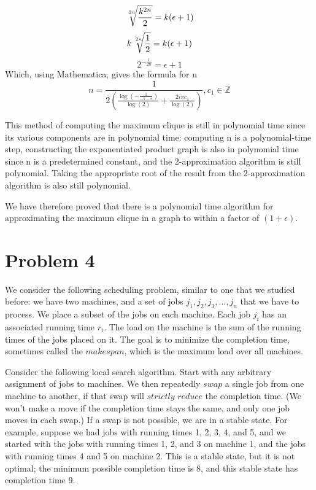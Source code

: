 \documentclass[11pt]{article}
\begin{document}
\begin{equation*}
	\sqrt[\leftroot{-3}\uproot{3}2n]{\frac{k^{2n}}{2}} = k(\epsilon + 1)
\end{equation*}
\begin{equation*}
	k\sqrt[\leftroot{-3}\uproot{3}2n]{\frac{1}{2}} = k(\epsilon + 1)
\end{equation*}
\begin{equation*}
	2^{-\frac{1}{2n}} = \epsilon + 1
\end{equation*}
Which, using Mathematica, gives the formula for n 
\begin{equation*}
	n = \frac{1}{2 \left(\frac{\log \left(-\frac{1}{-1-e}\right)}{\log (2)}+\frac{2 i \pi  c_1}{\log (2)}\right)},c_1\in \mathbb{Z}
\end{equation*}

This method of computing the maximum clique is still in polynomial time since its various components are in polynomial time: computing n is a polynomial-time step, constructing the exponentiated product graph is also in polynomial time since n is a predetermined constant, and the 2-approximation algorithm is still polynomial. Taking the appropriate root of the result from the 2-approximation algorithm is also still polynomial. 

We have therefore proved that there is a polynomial time algorithm for approximating the maximum clique in a graph to within a factor of $(1 + \epsilon)$.
\section{Problem 4}

We consider the following scheduling problem, similar to one that we studied before: we have two machines, and a set of jobs $j_1, j_2, j_3,..., j_n$ that we have to process. We place a subset of the jobs on each machine. Each job $j_i$ has an associated running time $r_i$. The load on the machine is the sum of the running times of the jobs placed on it. The goal is to minimize the completion time, sometimes called the $makespan$, which is the maximum load over all machines.

Consider the following local search algorithm. Start with any arbitrary assignment of jobs to machines. We then repeatedly $swap$ a single job from one machine to another, if that swap will $strictly$ $reduce$ the completion time. (We won't make a move if the completion time stays the same, and only one job moves in each swap.) If a swap is not possible, we are in a stable state. For example, suppose we had jobs with running times 1, 2, 3, 4, and 5, and we started with the jobs with running times 1, 2, and 3 on machine 1, and the jobs with running times 4 and 5 on machine 2. This is a stable state, but it is not optimal; the minimum possible completion time is 8, and this stable state has completion time 9.
\end{document}
